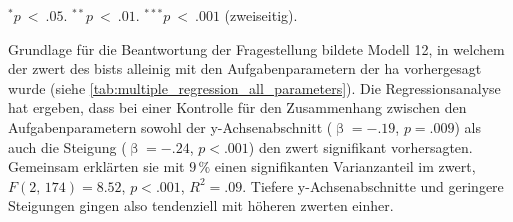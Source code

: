 \documentclass[11pt, twoside, a4paper]{book}		%
\begin{document}
\begin{table}[htbp]
\begin{adjustbox}{width=1\textwidth}
\begin{threeparttable}
			\begin{tablenotes}[flushleft]
				\footnotesize				%
				\setlength{}	%
				\item $^{*}p~<~.05$. $^{**}p~<~.01$. $^{***}p~<~.001$ (zweiseitig).
			\end{tablenotes}
		\end{threeparttable}
	\end{adjustbox}
\end{table}



Grundlage für die Beantwortung der Fragestellung bildete Modell 12, in welchem der \gls{zwert} des \gls{bist}s alleinig mit den Aufgabenparametern der \gls{ha} vorhergesagt wurde (siehe \autoref{tab:multiple_regression_all_parameters}).
Die Regressionsanalyse hat ergeben, dass bei einer Kontrolle für den Zusammenhang zwischen den Aufgabenparametern sowohl der y-Ach\-sen\-ab\-schnitt ($\upbeta=-.19$, $p=.009$) als auch die Steigung ($\upbeta=-.24$, $p<.001$) den \gls{zwert} signifikant vorhersagten. Gemeinsam erklärten sie mit $9\,\%$ einen signifikanten Varianzanteil im \gls{zwert}, $F(2,\,174)=8.52$, $p<.001$, $R^2=.09$. Tiefere y-Ach\-sen\-ab\-schnitte und geringere Steigungen gingen also tendenziell mit höheren \gls{zwert}en einher.

\end{document}
